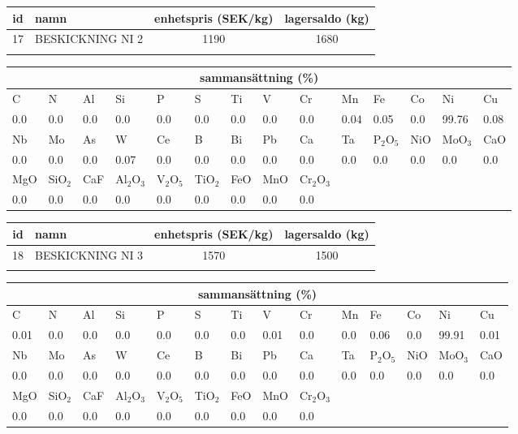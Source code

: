 \begin{center}
{\scriptsize\addtolength{\tabcolsep}{-3pt}
\begin{tabular}{clcc}
id&namn&enhetspris (SEK/kg)&lagersaldo (kg)\\
\hline
17&BESKICKNING NI 2&1190&1680\\\\
\end{tabular}
\begin{tabular}{llllllllllllll}
\multicolumn{14}{c}{sammansättning (\%)}\\
\hline
C&N&Al&Si&P&S&Ti&V&Cr&Mn&Fe&Co&Ni&Cu\\
\hline
0.0&0.0&0.0&0.0& 0.0&0.0&0.0&0.0& 0.0&0.04&0.05&0.0& 99.76&0.08\\
\hline
Nb&Mo&As&W&Ce&B&Bi&Pb&Ca&Ta&P$_2$O$_5$&NiO&MoO$_3$&CaO\\
\hline
0.0& 0.0& 0.0& 0.07& 0.0& 0.0& 0.0& 0.0& 0.0& 0.0& 0.0& 0.0& 0.0& 0.0\\
\hline
MgO&SiO$_2$&CaF&Al$_2$O$_3$&V$_2$O$_5$&TiO$_2$&FeO&MnO&Cr$_2$O$_3$\\
\hline
0.0& 0.0& 0.0& 0.0& 0.0& 0.0& 0.0& 0.0& 0.0\\
\end{tabular}
}
\end{center}

\begin{center}
{\scriptsize\addtolength{\tabcolsep}{-3pt}
\begin{tabular}{clcc}
id&namn&enhetspris (SEK/kg)&lagersaldo (kg)\\
\hline
18&BESKICKNING NI 3&1570&1500\\\\
\end{tabular}
\begin{tabular}{llllllllllllll}
\multicolumn{14}{c}{sammansättning (\%)}\\
\hline
C&N&Al&Si&P&S&Ti&V&Cr&Mn&Fe&Co&Ni&Cu\\
\hline
0.01&0.0&0.0&0.0& 0.0&0.0&0.0&0.01& 0.0&0.0&0.06&0.0& 99.91&0.01\\
\hline
Nb&Mo&As&W&Ce&B&Bi&Pb&Ca&Ta&P$_2$O$_5$&NiO&MoO$_3$&CaO\\
\hline
0.0& 0.0& 0.0& 0.0& 0.0& 0.0& 0.0& 0.0& 0.0& 0.0& 0.0& 0.0& 0.0& 0.0\\
\hline
MgO&SiO$_2$&CaF&Al$_2$O$_3$&V$_2$O$_5$&TiO$_2$&FeO&MnO&Cr$_2$O$_3$\\
\hline
0.0& 0.0& 0.0& 0.0& 0.0& 0.0& 0.0& 0.0& 0.0\\
\end{tabular}
}
\end{center}


